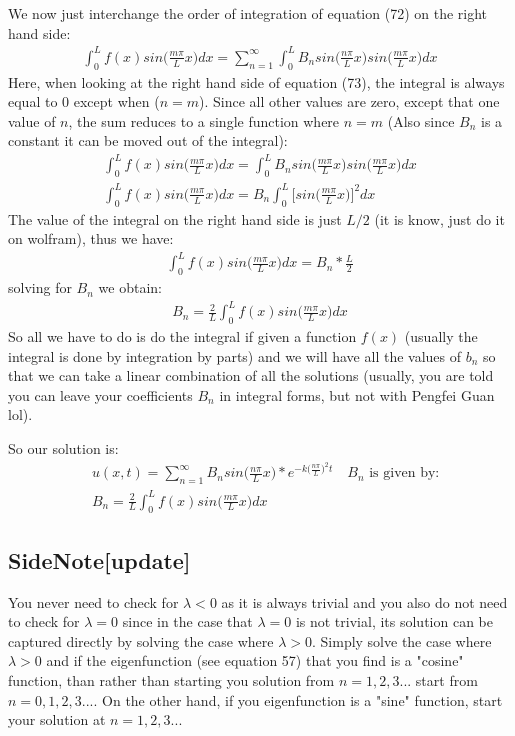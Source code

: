 \documentclass[11pt]{article}
\begin{document}
We now just interchange the order of integration of equation (72) on the right hand side:
\begin{align}
	\int_0^L f(x)sin\bigg(\frac{m\pi}{L} x\bigg)dx = \sum_{n=1}^{\infty} \int_0^L  B_nsin\bigg(\frac{n\pi}{L} x\bigg)sin\bigg(\frac{m\pi}{L} x\bigg)dx
\end{align}
Here, when looking at the right hand side of equation (73), the integral is always equal to 0 except when ($n=m$). Since all other values are zero, except that one value of $n$, the sum reduces to a single function where $n=m$ (Also since $B_n$ is a constant it can be moved out of the integral):
\begin{align}
	\int_0^L f(x)sin\bigg(\frac{m\pi}{L} x\bigg)dx =\int_0^L  B_nsin\bigg(\frac{m\pi}{L} x\bigg)sin\bigg(\frac{m\pi}{L} x\bigg)dx\\
	\int_0^L f(x)sin\bigg(\frac{m\pi}{L} x\bigg)dx =B_n\int_0^L  \bigg[sin\bigg(\frac{m\pi}{L} x\bigg)\bigg]^2dx 
\end{align} 
The value of the integral on the right hand side is just $L/2$ (it is know, just do it on wolfram), thus we have:
\begin{align}
	\int_0^L f(x)sin\bigg(\frac{m\pi}{L} x\bigg)dx =B_n *\frac{L}{2}
\end{align}
solving for $B_n$ we obtain:
\begin{align}
	 B_n= \frac{2}{L}\int_0^L f(x)sin\bigg(\frac{m\pi}{L} x\bigg)dx
\end{align}
So all we have to do is do the integral if given a function $f(x)$ (usually the integral is done by integration by parts) and we will have all the values of $b_n$ so that we can take a linear combination of all the solutions (usually, you are told you can leave your coefficients $B_n$ in integral forms, but not with Pengfei Guan lol).

So our solution is:
\begin{align}
	&u(x,t) = \sum_{n=1}^{\infty} B_nsin\bigg(\frac{n\pi}{L} x\bigg)*e^{-k\big(\frac{n\pi}{L}\big)^2t} \quad \text{$B_n$ is given by:}\\
	 &B_n= \frac{2}{L}\int_0^L f(x)sin\bigg(\frac{m\pi}{L} x\bigg)dx
\end{align}


\subsection{SideNote[update]}
You never need to check for $\lambda<0$ as it is always trivial and you also do not need to check for $\lambda=0$ since in the case that $\lambda=0$ is not trivial, its solution can be captured directly by solving the case where $\lambda>0$. Simply solve the case where $\lambda>0$ and if the eigenfunction (see equation 57) that you find is a "cosine" function, than rather than starting you solution from $n=1,2,3...$ start from $n=0,1,2,3...$. On the other hand, if you eigenfunction is a "sine" function, start your solution at $n=1,2,3...$
\end{document}
